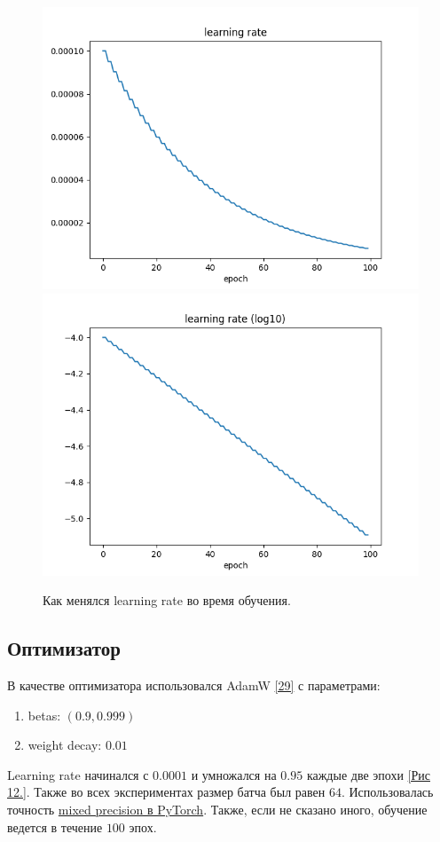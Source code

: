 \begin{figure}
    \centering
    \includegraphics[scale=0.5]{./images/lr.png} 
    \includegraphics[scale=0.5]{./images/lr_log.png}
    \caption{\protect\hypertarget{image12}{Как менялся learning rate во время обучения.}}
\end{figure}

\subsection{Оптимизатор}
В качестве оптимизатора использовался AdamW \hyperlink{cite.Los17}{[29]} с параметрами:
\begin{enumerate}
\item betas: $(0.9, 0.999)$
\item weight decay: $0.01$
\end{enumerate}
Learning rate начинался с $0.0001$ и умножался на $0.95$ каждые две эпохи \hyperlink{image12}{[Рис 12.]}. Также во всех экспериментах размер батча был равен $64$. Использовалась точность \href{https://pytorch.org/blog/what-every-user-should-know-about-mixed-precision-training-in-pytorch/}{mixed precision в PyTorch}. Также, если не сказано иного, обучение ведется в течение $100$ эпох.

